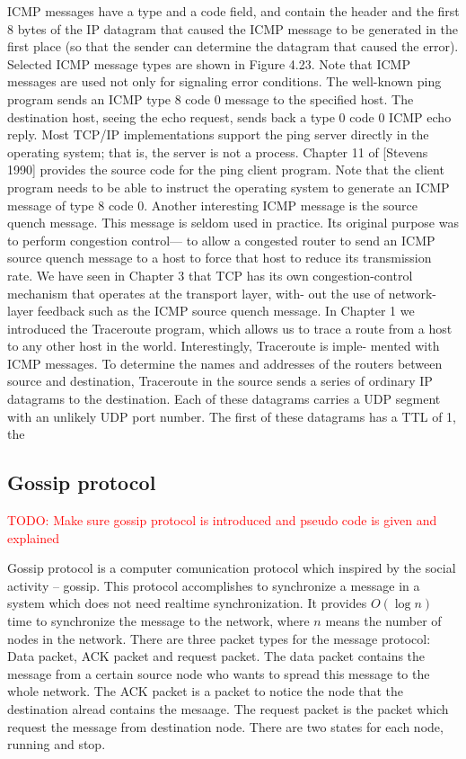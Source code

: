 \documentclass[12pt,journal]{IEEEtran}
\begin{document}
 
 ICMP messages have a type and a code field, and contain the header and the first 8 bytes of the IP datagram that caused the ICMP message to be generated in the first place (so that the sender can determine the datagram that caused the error). Selected ICMP message types are shown in Figure 4.23. Note that ICMP messages are used not only for signaling error conditions.
 The well-known ping program sends an ICMP type 8 code 0 message to the specified host. The destination host, seeing the echo request, sends back a type 0 code 0 ICMP echo reply. Most TCP/IP implementations support the ping server directly in the operating system; that is, the server is not a process. Chapter 11 of [Stevens 1990] provides the source code for the ping client program. Note that the client program needs to be able to instruct the operating system to generate an ICMP message of type 8 code 0.
 Another interesting ICMP message is the source quench message. This message is seldom used in practice. Its original purpose was to perform congestion control— to allow a congested router to send an ICMP source quench message to a host to force that host to reduce its transmission rate. We have seen in Chapter 3 that TCP has its own congestion-control mechanism that operates at the transport layer, with- out the use of network-layer feedback such as the ICMP source quench message.
 In Chapter 1 we introduced the Traceroute program, which allows us to trace a route from a host to any other host in the world. Interestingly, Traceroute is imple- mented with ICMP messages. To determine the names and addresses of the routers between source and destination, Traceroute in the source sends a series of ordinary IP datagrams to the destination. Each of these datagrams carries a UDP segment with an unlikely UDP port number. The first of these datagrams has a TTL of 1, the

\subsection{Gossip protocol }
\textcolor{red}{TODO: Make sure gossip protocol is introduced and pseudo code is given and explained}

Gossip protocol is a computer comunication protocol which inspired by the social activity -- gossip. This protocol accomplishes to synchronize a message in a system which does not need realtime synchronization. It provides $O(\log n)$ time to synchronize the message to the network, where $n$ means the number of nodes in the network. There are three packet types for the message protocol: Data packet, ACK packet and request packet. The data packet contains the message from a certain source node who wants to spread this message to the whole network. The ACK packet is a packet to notice the node that the destination alread contains the mesaage. The request packet is the packet which request the message from destination node. There are two states for each node, running and stop.
\end{document}
